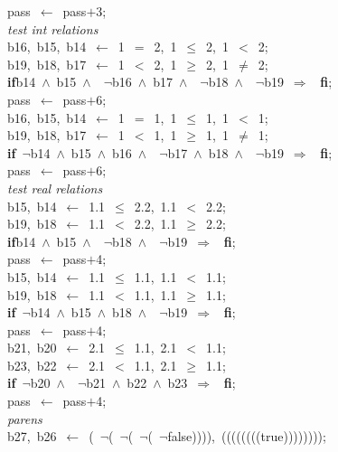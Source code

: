 \documentclass{report}
\begin{document}
\begin{tabbing}
pass\ $\leftarrow$\ pass$+$3;\\
{\tt{}}{\em{} test int relations
}\\
b16,\ b15,\ b14\ $\leftarrow$\ 1\ $=$\ 2,\ 1\ $\leq$\ 2,\ 1\ $<$\ 2;\\
b19,\ b18,\ b17\ $\leftarrow$\ 1\ $<$\ 2,\ 1\ $\geq$\ 2,\ 1\ $\neq$\ 2;\\
{\bf if}\>b14\ $\wedge$\ b15\ $\wedge$\ \ $\neg$b16\ $\wedge$\ b17\ $\wedge$\ \ $\neg$b18\ $\wedge$\ \ $\neg$b19\ $\Rightarrow$
\ {\bf {f}{i}};
\\
pass\ $\leftarrow$\ pass$+$6;\\
b16,\ b15,\ b14\ $\leftarrow$\ 1\ $=$\ 1,\ 1\ $\leq$\ 1,\ 1\ $<$\ 1;\\
b19,\ b18,\ b17\ $\leftarrow$\ 1\ $<$\ 1,\ 1\ $\geq$\ 1,\ 1\ $\neq$\ 1;\\
{\bf if}\>\ $\neg$b14\ $\wedge$\ b15\ $\wedge$\ b16\ $\wedge$\ \ $\neg$b17\ $\wedge$\ b18\ $\wedge$\ \ $\neg$b19\ $\Rightarrow$
\ {\bf {f}{i}};
\\
pass\ $\leftarrow$\ pass$+$6;\\
{\tt{}}{\em{} test real relations
}\\
b15,\ b14\ $\leftarrow$\ 1.1\ $\leq$\ 2.2,\ 1.1\ $<$\ 2.2;\\
b19,\ b18\ $\leftarrow$\ 1.1\ $<$\ 2.2,\ 1.1\ $\geq$\ 2.2;\\
{\bf if}\>b14\ $\wedge$\ b15\ $\wedge$\ \ $\neg$b18\ $\wedge$\ \ $\neg$b19\ $\Rightarrow$
\ {\bf {f}{i}};
\\
pass\ $\leftarrow$\ pass$+$4;\\
b15,\ b14\ $\leftarrow$\ 1.1\ $\leq$\ 1.1,\ 1.1\ $<$\ 1.1;\\
b19,\ b18\ $\leftarrow$\ 1.1\ $<$\ 1.1,\ 1.1\ $\geq$\ 1.1;\\
{\bf if}\>\ $\neg$b14\ $\wedge$\ b15\ $\wedge$\ b18\ $\wedge$\ \ $\neg$b19\ $\Rightarrow$
\ {\bf {f}{i}};
\\
pass\ $\leftarrow$\ pass$+$4;\\
b21,\ b20\ $\leftarrow$\ 2.1\ $\leq$\ 1.1,\ 2.1\ $<$\ 1.1;\\
b23,\ b22\ $\leftarrow$\ 2.1\ $<$\ 1.1,\ 2.1\ $\geq$\ 1.1;\\
{\bf if}\>\ $\neg$b20\ $\wedge$\ \ $\neg$b21\ $\wedge$\ b22\ $\wedge$\ b23\ $\Rightarrow$
\ {\bf {f}{i}};
\\
pass\ $\leftarrow$\ pass$+$4;\\
{\tt{}}{\em{} parens
}\\
b27,\ b26\ $\leftarrow$\ (\ $\neg$(\ $\neg$(\ $\neg$(\ $\neg$false)))),\ ((((((((true))))))));\\

\end{tabbing}
\end{document}
